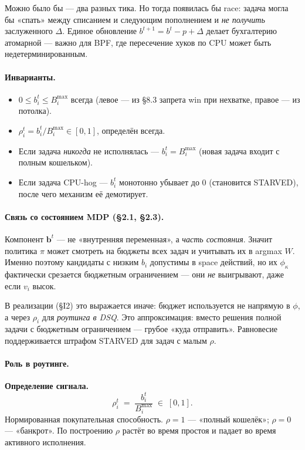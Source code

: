\documentclass[11pt,a4paper]{article}
\begin{document}
\begin{why}
Можно было бы — два разных тика. Но тогда появилась бы race:
задача могла бы «спать» между списанием и следующим пополнением
и \emph{не получить} заслуженного $\Delta$. Единое обновление
$b^{t+1}=b^t-p+\Delta$ делает бухгалтерию атомарной — важно для
BPF, где пересечение хуков по CPU может быть недетерминированным.
\end{why}

\paragraph{Инварианты.}
\begin{itemize}
  \item $0 \leq b_i^t \leq B_i^{\max}$ всегда (левое — из §8.3 запрета
    win при нехватке, правое — из потолка).
  \item $\rho_i^t = b_i^t/B_i^{\max} \in [0,1]$, определён всегда.
  \item Если задача \emph{никогда} не исполнялась — $b_i^t=B_i^{\max}$
    (новая задача входит с полным кошельком).
  \item Если задача CPU-hog — $b_i^t$ монотонно убывает до 0
    (становится STARVED), после чего механизм её демотирует.
\end{itemize}

\paragraph{Связь со состоянием MDP (§2.1, §2.3).}
Компонент $\mathbf{b}^t$ — не «внутренняя переменная», а
\emph{часть состояния}. Значит политика $\pi$ может смотреть на
бюджеты всех задач и учитывать их в argmax $W$. Именно поэтому
кандидаты с низким $b_i$ допустимы в space действий, но их
$\phi_\kappa$ фактически срезается бюджетным ограничением — они
\emph{не} выигрывают, даже если $v_i$ высок.

В реализации (§I2) это выражается иначе: бюджет используется не
напрямую в $\phi$, а через $\rho_i$ для \emph{роутинга в DSQ}. Это
аппроксимация: вместо решения полной задачи с бюджетным
ограничением — грубое «куда отправить». Равновесие поддерживается
штрафом STARVED для задач с малым $\rho$.

\paragraph{Роль в роутинге.}

\textbf{Определение сигнала.}
\[
\rho_i^t \;=\; \frac{b_i^t}{B_i^{\max}} \;\in\; [0,1].
\]
Нормированная покупательная способность. $\rho=1$ — «полный
кошелёк»; $\rho=0$ — «банкрот». По построению $\rho$ растёт во
время простоя и падает во время активного исполнения.
\end{document}
